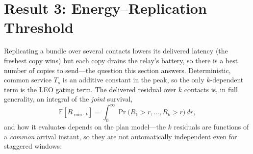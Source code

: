 \documentclass[twocolumn,3p,times,procedia]{elsarticle}
\newcommand{\E}{\mathbb{E}}
\begin{document}
\section{Result 3: Energy--Replication Threshold}\label{sec:r3}
Replicating a bundle over several contacts lowers its delivered latency
(the freshest copy wins) but each copy drains the relay's battery, so
there is a best number of copies to send---the question this section
answers. Deterministic, common service $T_s$ is an additive constant in
the peak, so the only $k$-dependent term is the LEO gating term. The
delivered residual over $k$ contacts is, in full generality, an integral
of the \emph{joint} survival,
\begin{equation}\label{eq:rminjoint}
\E[R_{\min,k}]=\int_0^\infty\Pr\bigl(R_1>r,\dots,R_k>r\bigr)\,dr,
\end{equation}
and how it evaluates depends on the plan model---the $k$ residuals are
functions of a \emph{common} arrival instant, so they are not
automatically independent even for staggered windows:
\end{document}
